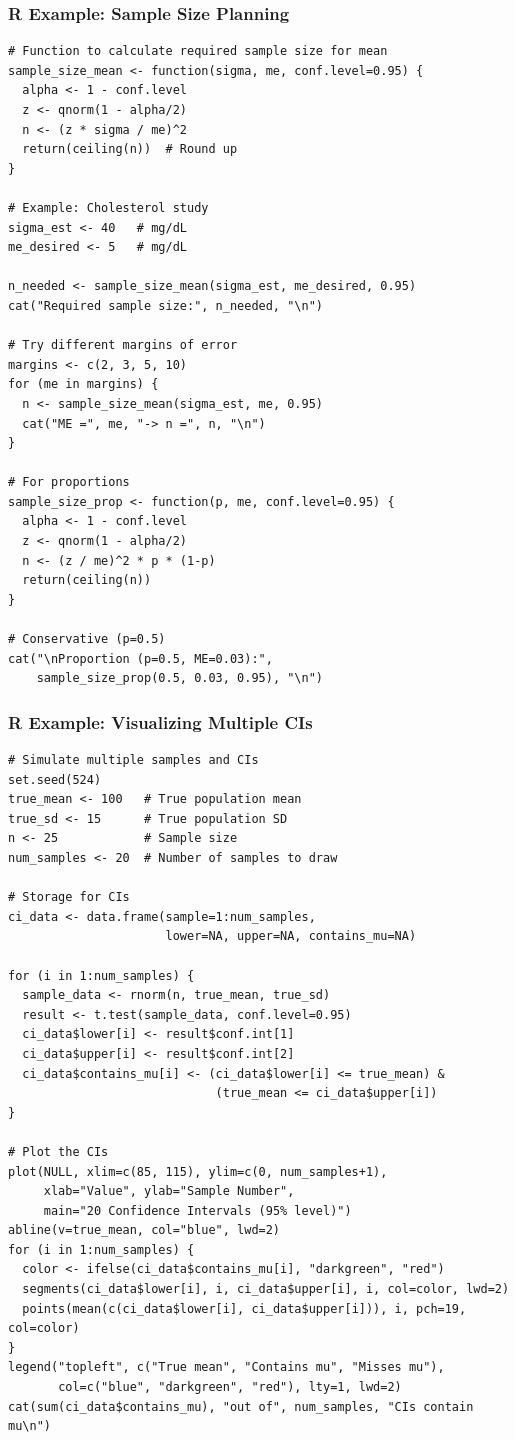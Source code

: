 \documentclass{beamer}
\begin{document}
\begin{frame}[fragile]
\frametitle{R Example: Sample Size Planning}
\footnotesize
\begin{verbatim}
# Function to calculate required sample size for mean
sample_size_mean <- function(sigma, me, conf.level=0.95) {
  alpha <- 1 - conf.level
  z <- qnorm(1 - alpha/2)
  n <- (z * sigma / me)^2
  return(ceiling(n))  # Round up
}

# Example: Cholesterol study
sigma_est <- 40   # mg/dL
me_desired <- 5   # mg/dL

n_needed <- sample_size_mean(sigma_est, me_desired, 0.95)
cat("Required sample size:", n_needed, "\n")

# Try different margins of error
margins <- c(2, 3, 5, 10)
for (me in margins) {
  n <- sample_size_mean(sigma_est, me, 0.95)
  cat("ME =", me, "-> n =", n, "\n")
}

# For proportions
sample_size_prop <- function(p, me, conf.level=0.95) {
  alpha <- 1 - conf.level
  z <- qnorm(1 - alpha/2)
  n <- (z / me)^2 * p * (1-p)
  return(ceiling(n))
}

# Conservative (p=0.5)
cat("\nProportion (p=0.5, ME=0.03):",
    sample_size_prop(0.5, 0.03, 0.95), "\n")
\end{verbatim}
\end{frame}

\begin{frame}[fragile]
\frametitle{R Example: Visualizing Multiple CIs}
\footnotesize
\begin{verbatim}
# Simulate multiple samples and CIs
set.seed(524)
true_mean <- 100   # True population mean
true_sd <- 15      # True population SD
n <- 25            # Sample size
num_samples <- 20  # Number of samples to draw

# Storage for CIs
ci_data <- data.frame(sample=1:num_samples,
                      lower=NA, upper=NA, contains_mu=NA)

for (i in 1:num_samples) {
  sample_data <- rnorm(n, true_mean, true_sd)
  result <- t.test(sample_data, conf.level=0.95)
  ci_data$lower[i] <- result$conf.int[1]
  ci_data$upper[i] <- result$conf.int[2]
  ci_data$contains_mu[i] <- (ci_data$lower[i] <= true_mean) &
                             (true_mean <= ci_data$upper[i])
}

# Plot the CIs
plot(NULL, xlim=c(85, 115), ylim=c(0, num_samples+1),
     xlab="Value", ylab="Sample Number",
     main="20 Confidence Intervals (95% level)")
abline(v=true_mean, col="blue", lwd=2)
for (i in 1:num_samples) {
  color <- ifelse(ci_data$contains_mu[i], "darkgreen", "red")
  segments(ci_data$lower[i], i, ci_data$upper[i], i, col=color, lwd=2)
  points(mean(c(ci_data$lower[i], ci_data$upper[i])), i, pch=19, col=color)
}
legend("topleft", c("True mean", "Contains mu", "Misses mu"),
       col=c("blue", "darkgreen", "red"), lty=1, lwd=2)
cat(sum(ci_data$contains_mu), "out of", num_samples, "CIs contain mu\n")
\end{verbatim}
\end{frame}
\end{document}
